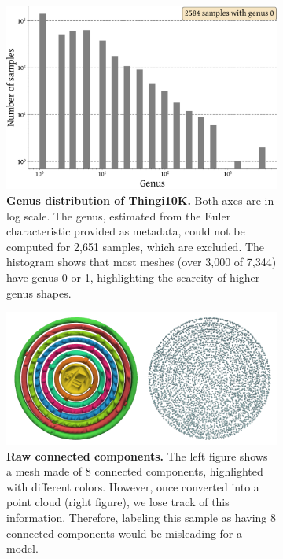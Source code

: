 \begin{figure}
  \centering
  \begin{subfigure}[t]{0.40\linewidth}
    \centering
    \includegraphics[width=\linewidth]{figs/topogen/thingi_genus_hist.pdf}
    \caption{\textbf{Genus distribution of Thingi10K.} Both axes are in log scale. The genus, estimated from the Euler characteristic provided as metadata, could not be computed for 2,651 samples, which are excluded. The histogram shows that most meshes (over 3,000 of 7,344) have genus 0 or 1, highlighting the scarcity of higher-genus shapes.}
    \label{fig:thingi-genus}
  \end{subfigure}
  \hfill
  \begin{subfigure}[t]{0.58\linewidth}
    \centering
    \includegraphics[width=\linewidth]{figs/connected_comps_thingi.pdf}
    \caption{\textbf{Raw connected components.} The left figure shows a mesh made of 8 connected components, highlighted with different colors. However, once converted into a point cloud (right figure), we lose track of this information. Therefore, labeling this sample as having 8 connected components would be misleading for a model.}
    \label{fig:thingi-comps}
  \end{subfigure}
  \caption{}
  \label{fig:thingi-overview}
\end{figure}


